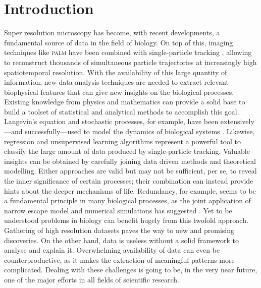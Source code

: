 
\chapter{Introduction}\label{sec:introduction}

Super resolution microscopy has become, with recent developments, a fundamental source of data in the field of biology. On top of this, imaging techniques like \textsc{palm} have been combined with single-particle tracking , allowing to reconstruct thousands of simultaneous particle trajectories at increasingly high spatiotemporal resolution. With the availability of this large quantity of information, new data analysis techniques are needed to extract relevant biophysical features that can give new insights on the biological processes. Existing knowledge from physics and mathematics can provide a solid base to build a toolset of statistical and analytical methods to accomplish this goal. Langevin's equation and stochastic processes, for example, have been extensively---and successfully---used to model the dynamics of biological systems . Likewise, regression and unsupervised learning algorithms represent a powerful tool to classify the large amount of data produced by single-particle tracking. Valuable insights can be obtained by carefully joining data driven methods and theoretical modelling. Either approaches are valid but may not be sufficient, per se, to reveal the inner significance of certain processes; their combination can instead provide hints about the deeper mechanisms of life. Redundancy, for example, seems to be a fundamental principle in many biological processes, as the joint application of narrow escape model and numerical simulations has suggested . Yet to be understood problems in biology can benefit hugely from this twofold approach. Gathering of high resolution datasets paves the way to new and promising discoveries. On the other hand, data is useless without a solid framework to analyse and explain it. Overwhelming availability of data can even be counterproductive, as it makes the extraction of meaningful patterns more complicated. Dealing with these challenges is going to be, in the very near future, one of the major efforts in all fields of scientific research.

